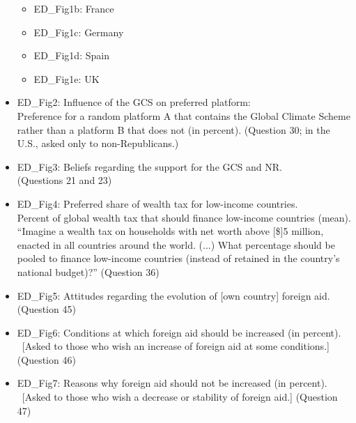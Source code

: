 \begin{itemize}
\begin{itemize}
    \item ED\_Fig1b: France
    \item ED\_Fig1c: Germany
    \item ED\_Fig1d: Spain
    \item ED\_Fig1e: UK
  \end{itemize}
  \item ED\_Fig2: Influence of the GCS on preferred platform:\\ Preference for a random platform A that contains the Global Climate Scheme rather than a platform B that does not (in percent). (Question 30; in the U.S., asked only to non-Republicans.)
  \item ED\_Fig3: Beliefs regarding the support for the GCS and NR.\\ (Questions 21 and 23)
  \item ED\_Fig4: Preferred share of wealth tax for low-income countries.\\ Percent of global wealth tax that should finance low-income countries (mean).\\
  ``Imagine a wealth tax on households with net worth above [\$]5 million, enacted in all   countries around the world. (...)   What percentage should be pooled to finance low-income countries (instead of retained  in the country's national budget)?'' (Question 36)
  \item ED\_Fig5: Attitudes regarding the evolution of [own country] foreign aid.\\ (Question 45)
  \item ED\_Fig6: Conditions at which foreign aid should be increased (in percent).\\ ~[Asked to those who wish an increase of foreign aid at some conditions.] (Question 46)
  \item ED\_Fig7: Reasons why foreign aid should not be increased (in percent).\\ ~[Asked to those who wish a decrease or stability of foreign aid.] (Question 47)
\end{itemize}





% 

